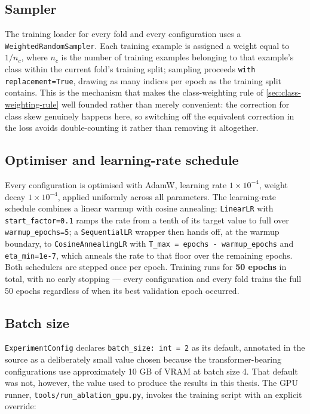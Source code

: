 \subsection{Sampler}
\label{sec:sampler-config}

The training loader for every fold and every configuration uses a \texttt{WeightedRandomSampler}. Each training example is assigned a weight equal to $1/n_c$, where $n_c$ is the number of training examples belonging to that example's class within the current fold's training split; sampling proceeds \texttt{with replacement=True}, drawing as many indices per epoch as the training split contains. This is the mechanism that makes the class-weighting rule of \autoref{sec:class-weighting-rule} well founded rather than merely convenient: the correction for class skew genuinely happens here, so switching off the equivalent correction in the loss avoids double-counting it rather than removing it altogether.

\subsection{Optimiser and learning-rate schedule}
\label{sec:optimiser-config}

Every configuration is optimised with AdamW, learning rate $1\times10^{-4}$, weight decay $1\times10^{-4}$, applied uniformly across all parameters. The learning-rate schedule combines a linear warmup with cosine annealing: \texttt{LinearLR} with \texttt{start\_factor=0.1} ramps the rate from a tenth of its target value to full over \texttt{warmup\_epochs=5}; a \texttt{SequentialLR} wrapper then hands off, at the warmup boundary, to \texttt{CosineAnnealingLR} with \texttt{T\_max = epochs - warmup\_epochs} and \texttt{eta\_min=1e-7}, which anneals the rate to that floor over the remaining epochs. Both schedulers are stepped once per epoch. Training runs for \textbf{50 epochs} in total, with no early stopping --- every configuration and every fold trains the full 50 epochs regardless of when its best validation epoch occurred.

\subsection{Batch size}
\label{sec:batch-size}

\texttt{ExperimentConfig} declares \texttt{batch\_size: int = 2} as its default, annotated in the source as a deliberately small value chosen because the transformer-bearing configurations use approximately 10 GB of VRAM at batch size 4. That default was not, however, the value used to produce the results in this thesis. The GPU runner, \texttt{tools/run\_ablation\_gpu.py}, invokes the training script with an explicit override:

